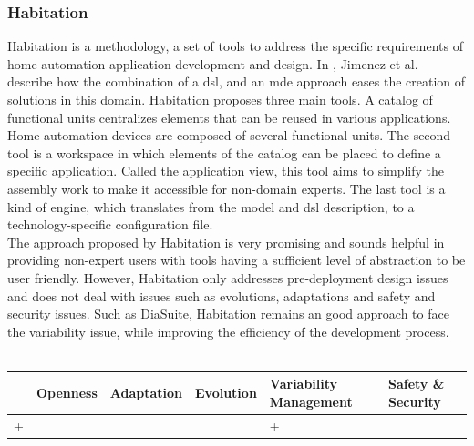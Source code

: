 \subsubsection{Habitation}
Habitation is a methodology, a set of tools to address the specific requirements of home automation application development and design. In \cite{Jimenez:2009}, Jimenez et al. describe how the combination of a \gls{dsl}, and an \gls{mde} approach eases the creation of solutions in this domain. Habitation proposes three main tools. A catalog of functional units centralizes elements that can be reused in various applications. Home automation devices are composed of several functional units. The second tool is a workspace in which elements of the catalog can be placed to define a specific application. Called the application view, this tool aims to simplify the assembly work to make it accessible for non-domain experts. The last tool is a kind of engine, which translates from the model and \gls{dsl} description, to a technology-specific configuration file.\\

The approach proposed by Habitation is very promising and sounds helpful in providing non-expert users with tools having a sufficient level of abstraction to be user friendly. However, Habitation only addresses pre-deployment design issues and does not deal with issues such as evolutions, adaptations and safety and security issues. Such as DiaSuite, Habitation remains an good approach to face the variability issue, while improving the efficiency of the development process.\\
\\
\begin{tabular}{ >{\centering}m{}| >{\centering}m{} >{\centering}m{}| >{\centering}m{} >{\centering}m{}| >{\centering\arraybackslash}m{}}
{\tiny Interoperability} & {\tiny Openness} & {\tiny Adaptation} & {\tiny Evolution} & {\tiny Variability Management} & {\tiny Safety \& Security}\\
 \hline
 + &  &  &  & + & \\ 
  \hline
\end{tabular}\\


